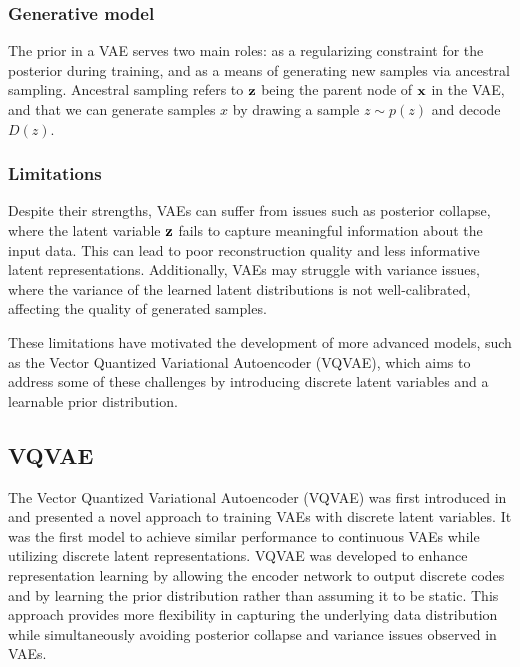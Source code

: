 \documentclass[../../thesis.tex]{subfiles}
\begin{document}
\subsubsection{Generative model}
The prior in a VAE serves two main roles: as a regularizing constraint for the posterior during training, and as a means of generating new samples via ancestral sampling. Ancestral sampling refers to $\mathbf{z}$ being the parent node of $\mathbf{x}$ in the VAE, and that we can generate samples $x$ by drawing a sample $z\sim p(z)$ and decode $D(z)$. 


\subsubsection{Limitations}

Despite their strengths, VAEs can suffer from issues such as posterior collapse, where the latent variable $\mathbf{z}$ fails to capture meaningful information about the input data. This can lead to poor reconstruction quality and less informative latent representations. Additionally, VAEs may struggle with variance issues, where the variance of the learned latent distributions is not well-calibrated, affecting the quality of generated samples.\newline

These limitations have motivated the development of more advanced models, such as the Vector Quantized Variational Autoencoder (VQVAE), which aims to address some of these challenges by introducing discrete latent variables and a learnable prior distribution.


\subsection{VQVAE}
The Vector Quantized Variational Autoencoder (VQVAE) was first introduced in \cite{VQVAE} and presented a novel approach to training VAEs with discrete latent variables. It was the first model to achieve similar performance to continuous VAEs while utilizing discrete latent representations. VQVAE was developed to enhance representation learning by allowing the encoder network to output discrete codes and by learning the prior distribution rather than assuming it to be static. This approach provides more flexibility in capturing the underlying data distribution while simultaneously avoiding posterior collapse and variance issues observed in VAEs.
\end{document}
